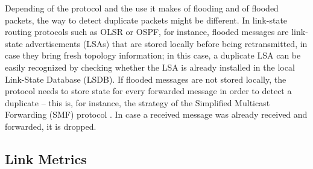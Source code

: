 Depending of the protocol and the use it makes of flooding and of flooded packets, the way to detect duplicate packets might be different. In link-state routing protocols such as OLSR or OSPF, for instance, flooded messages are link-state advertisements (LSAs) that are stored locally before being retransmitted, in case they bring fresh topology information; in this case, a duplicate LSA can be easily recognized by checking whether the LSA is already installed in the local Link-State Database (LSDB). If flooded messages are not stored locally, the protocol needs to store state for every forwarded message in order to detect a duplicate -- this is, for instance, the strategy of the Simplified Multicast Forwarding (SMF) protocol \cite{rfc6621}. In case a received message was already received and forwarded, it is dropped.

\subsection{Link Metrics}
\label{ss:metrics}


